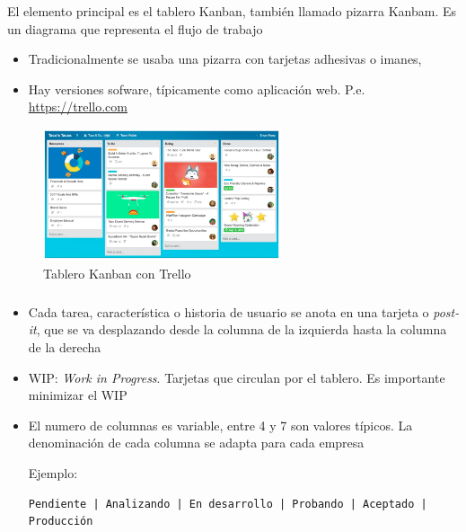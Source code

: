 \documentclass[ucs]{beamer}
\begin{document}

\begin{frame}[fragile]

El elemento principal es el tablero Kanban, también llamado pizarra Kanbam. Es un diagrama que representa el flujo de trabajo
\begin{itemize}
\item
Tradicionalmente se usaba una pizarra con tarjetas adhesivas o imanes,

\item
Hay versiones sofware, típicamente como aplicación web. P.e.
\url{https://trello.com}
\end{itemize}

\begin{figure}
\centerline{\includegraphics[width=7cm]{figs/trello}}
\caption{Tablero Kanban con Trello}
\end{figure}
\end{frame}



\begin{frame}[fragile]
\frametitle{}
\begin{itemize}
\item
Cada tarea, característica o historia de usuario se anota en una
tarjeta o \emph{post-it}, que se va desplazando desde la columna de la izquierda
hasta la columna de la derecha

\item
WIP: \emph{Work in Progress}. Tarjetas que circulan por el tablero.
Es importante minimizar el WIP

\item
El numero de columnas es variable, entre 4 y 7 son valores típicos. La
denominación de cada columna se adapta para cada empresa

Ejemplo:

  \begin{scriptsize}
  \begin{verbatim}
Pendiente | Analizando | En desarrollo | Probando | Aceptado | Producción 
  \end{verbatim}
  \end{scriptsize}
\end{itemize}
\end{frame}
\end{document}
